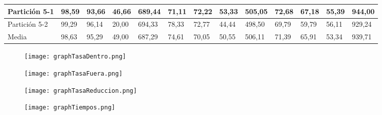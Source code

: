\documentclass[10pt,a4paper]{article}
\begin{document}
\begin{table}[ht]
{\begin{tabular}{|l|l|l|l|l|l|l|l|l|l|l|l|l|}
Partición 5-1                                & 98,59        & 93,66         & 46,66   & 689,44 & 71,11        & 72,22         & 53,33   & 505,05 & 72,68        & 67,18         & 55,39   & 944,00 \\ \hline
Partición 5-2                                & 99,29        & 96,14         & 20,00   & 694,33 & 78,33        & 72,77         & 44,44   & 498,50 & 69,79        & 59,79         & 56,11   & 929,24 \\ \hline
Media                                        & 98,63        & 95,29         & 49,00   & 687,29 & 74,61        & 70,05         & 50,55   & 506,11 & 71,39        & 65,91         & 53,34   & 939,71 \\ \hline
\end{tabular}}
\end{table}
\newpage

\begin{figure}[H]
\centering
\texttt{[image: graphTasaDentro.png]}
\end{figure}


\begin{figure}[H]
\centering
\texttt{[image: graphTasaFuera.png]}
\end{figure}


\begin{figure}[H]
\centering
\texttt{[image: graphTasaReduccion.png]}
\end{figure}


\begin{figure}[H]
\centering
\texttt{[image: graphTiempos.png]}
\end{figure}
\end{document}
